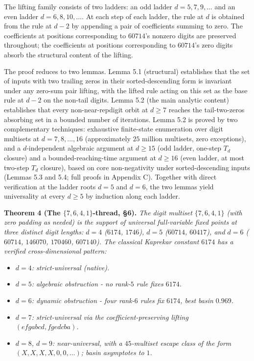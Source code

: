 \documentclass[11pt,letterpaper]{article}
\providecommand{\tightlist}{%
  \setlength{\itemsep}{0pt}\setlength{\parskip}{0pt}}
\theoremstyle{paperstyle}
\theoremstyle{paperstyledef}
\theoremstyle{paperstylerem}
\begin{document}
The lifting family consists of two ladders: an odd ladder
\(d = 5, 7, 9, \ldots\) and an even ladder \(d = 6, 8, 10, \ldots\). At
each step of each ladder, the rule at \(d\) is obtained from the rule at
\(d - 2\) by appending a pair of coefficients summing to zero. The
coefficients at positions corresponding to \(60714\)'s nonzero digits
are preserved throughout; the coefficients at positions corresponding to
\(60714\)'s zero digits absorb the structural content of the lifting.

The proof reduces to two lemmas. Lemma 5.1 (structural) establishes that
the set of inputs with two trailing zeros in their sorted-descending
form is invariant under any zero-sum pair lifting, with the lifted rule
acting on this set as the base rule at \(d - 2\) on the non-tail digits.
Lemma 5.2 (the main analytic content) establishes that every
non-near-repdigit orbit at \(d \geq 7\) reaches the tail-two-zeros
absorbing set in a bounded number of iterations. Lemma 5.2 is proved by
two complementary techniques: exhaustive finite-state enumeration over
digit multisets at \(d = 7, 8, \ldots, 16\) (approximately \(25\)
million multisets, zero exceptions), and a \(d\)-independent algebraic
argument at \(d \geq 15\) (odd ladder, one-step \(T_d\) closure) and a
bounded-reaching-time argument at \(d \geq 16\) (even ladder, at most
two-step \(T_d\) closure), based on core non-negativity under
sorted-descending inputs (Lemmas 5.3 and 5.4; full proofs in Appendix
C). Together with direct verification at the ladder roots \(d = 5\) and
\(d = 6\), the two lemmas yield universality at every \(d \geq 5\) by
induction along each ladder.

\textbf{Theorem 4 (The \(\{7, 6, 4, 1\}\)-thread, §6).} \emph{The digit
multiset \(\{7, 6, 4, 1\}\) (with zero padding as needed) is the support
of universal full-variable fixed points at three distinct digit lengths:
\(d = 4\) (\(6174\), \(1746\)), \(d = 5\) (\(60714\), \(60417\)), and
\(d = 6\) (\(60714\), \(146070\), \(170460\), \(607140\)). The classical
Kaprekar constant \(6174\) has a verified cross-dimensional pattern:}

\begin{itemize}
\tightlist
\item
  \emph{\(d = 4\): strict-universal (native).}
\item
  \emph{\(d = 5\): algebraic obstruction - no rank-\(5\) rule fixes
  \(6174\).}
\item
  \emph{\(d = 6\): dynamic obstruction - four rank-\(6\) rules fix
  \(6174\), best basin \(0.969\).}
\item
  \emph{\(d = 7\): strict-universal via the coefficient-preserving
  lifting \((efgabcd, fgedcba)\).}
\item
  \emph{\(d = 8\), \(d = 9\): near-universal, with a \(45\)-multiset
  escape class of the form \((X, X, X, X, 0, 0, \ldots)\); basin
  asymptotes to \(1\).}
\end{itemize}
\end{document}
